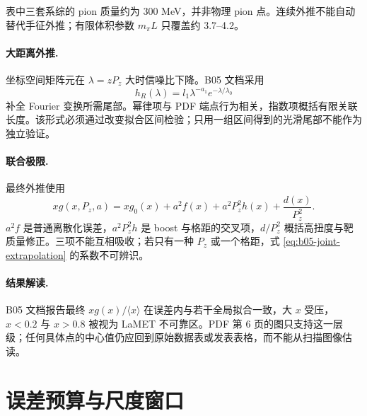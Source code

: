 表中三套系综的 pion 质量约为 300 MeV，并非物理 pion 点。连续外推不能自动替代手征外推；有限体积参数 \(m_\pi L\) 只覆盖约 3.7--4.2。

\paragraph{大距离外推.}
坐标空间矩阵元在 \(\lambda=zP_z\) 大时信噪比下降。B05 文档采用
\begin{equation}
  h_R(\lambda)=l_1\lambda^{-a_1}e^{-\lambda/\lambda_0}
  \label{eq:b05-lambda-tail}
\end{equation}
补全 Fourier 变换所需尾部。幂律项与 PDF 端点行为相关，指数项概括有限关联长度。该形式必须通过改变拟合区间检验；只用一组区间得到的光滑尾部不能作为独立验证。

\paragraph{联合极限.}
最终外推使用
\begin{equation}
  xg(x,P_z,a)
  =xg_0(x)+a^2f(x)+a^2P_z^2h(x)+\frac{d(x)}{P_z^2}.
  \label{eq:b05-joint-extrapolation}
\end{equation}
\(a^2f\) 是普通离散化误差，\(a^2P_z^2h\) 是 boost 与格距的交叉项，\(d/P_z^2\) 概括高扭度与靶质量修正。三项不能互相吸收；若只有一种 \(P_z\) 或一个格距，式 \eqref{eq:b05-joint-extrapolation} 的系数不可辨识。

\paragraph{结果解读.}
B05 文档报告最终 \(xg(x)/\langle x\rangle\) 在误差内与若干全局拟合一致，大 \(x\) 受压，\(x<0.2\) 与 \(x>0.8\) 被视为 LaMET 不可靠区。PDF 第 6 页的图只支持这一层级；任何具体点的中心值仍应回到原始数据表或发表表格，而不能从扫描图像估读。

\section{误差预算与尺度窗口}

